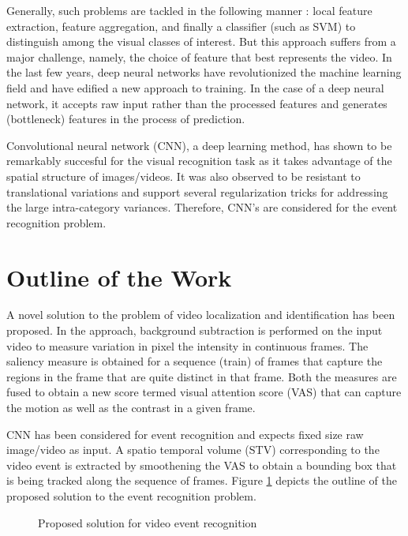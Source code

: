 \par Generally, such problems are tackled in the following manner : local feature extraction, feature aggregation, and finally a classifier (such as SVM) to distinguish among the visual classes of interest.  But this approach suffers from a major challenge, namely, the choice of feature that best represents the video.  In the last few years, deep neural networks have revolutionized the machine learning field and have edified a new approach to training.  In the case of a deep neural network, it accepts raw input rather than the processed features and generates (bottleneck) features in the process of prediction. 
\par Convolutional neural network (CNN), a deep learning method, has shown to be remarkably succesful for the visual recognition task as it takes advantage of the spatial structure of images/videos.  It was also observed to be resistant to translational variations and support several regularization tricks for addressing the large intra-category variances.  Therefore, CNN's are considered for  the event recognition problem.
\clearpage

\section{Outline of the Work}
A novel solution to the problem of video localization and identification has been proposed. In the approach, background subtraction is performed on the input video to measure variation in pixel the intensity in continuous frames.  The saliency measure is obtained for a sequence (train) of frames that capture the regions in the frame that are quite distinct in that frame.  Both the measures are fused to obtain a new score termed visual attention score (VAS) that can capture the motion as well as the contrast in a given frame. 
\par CNN has been considered for event recognition and expects fixed size raw image/video as input. A spatio temporal volume (STV) corresponding to the video event is extracted by smoothening the VAS to obtain a bounding box that is being tracked along the sequence of frames.  Figure \ref{fig:outline}  depicts the outline of the proposed solution to the event recognition problem.
\begin{figure}[htpb]
   \begin{center}
	   	{%
			\setlength{\fboxsep}{5pt}%
	    }%
     \caption {Proposed solution for video event recognition}
   \label{fig:outline}
   \end{center}
 \end{figure}
